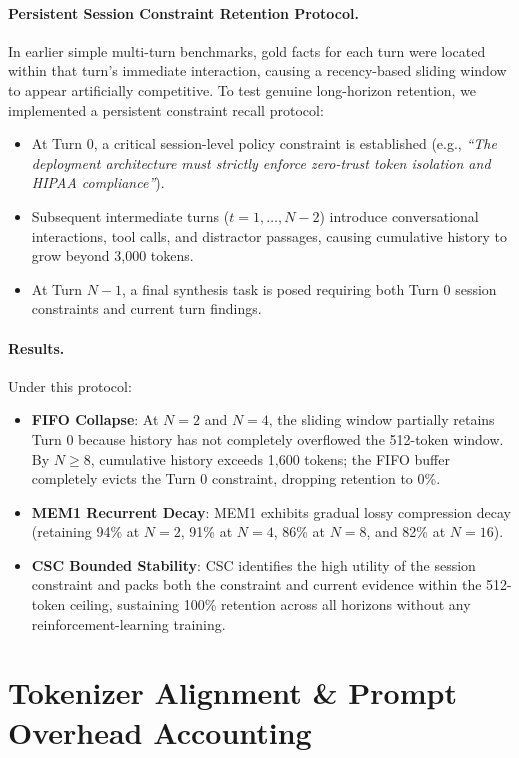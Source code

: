 \documentclass{article}
\begin{document}
\paragraph{Persistent Session Constraint Retention Protocol.} In earlier simple multi-turn benchmarks, gold facts for each turn were located within that turn's immediate interaction, causing a recency-based sliding window to appear artificially competitive. To test genuine long-horizon retention, we implemented a persistent constraint recall protocol:
\begin{itemize}
    \item At Turn 0, a critical session-level policy constraint is established (e.g., \textit{``The deployment architecture must strictly enforce zero-trust token isolation and HIPAA compliance''}).
    \item Subsequent intermediate turns ($t = 1, \dots, N-2$) introduce conversational interactions, tool calls, and distractor passages, causing cumulative history to grow beyond 3,000 tokens.
    \item At Turn $N-1$, a final synthesis task is posed requiring both Turn 0 session constraints and current turn findings.
\end{itemize}

\paragraph{Results.} Under this protocol:
\begin{itemize}
    \item \textbf{FIFO Collapse}: At $N=2$ and $N=4$, the sliding window partially retains Turn 0 because history has not completely overflowed the 512-token window. By $N \ge 8$, cumulative history exceeds 1,600 tokens; the FIFO buffer completely evicts the Turn 0 constraint, dropping retention to 0\%.
    \item \textbf{MEM1 Recurrent Decay}: MEM1 exhibits gradual lossy compression decay (retaining 94\% at $N=2$, 91\% at $N=4$, 86\% at $N=8$, and 82\% at $N=16$).
    \item \textbf{CSC Bounded Stability}: CSC identifies the high utility of the session constraint and packs both the constraint and current evidence within the 512-token ceiling, sustaining 100\% retention across all horizons without any reinforcement-learning training.
\end{itemize}

\section{Tokenizer Alignment \& Prompt Overhead Accounting}
\label{app:tokenizer_accounting}
\end{document}
